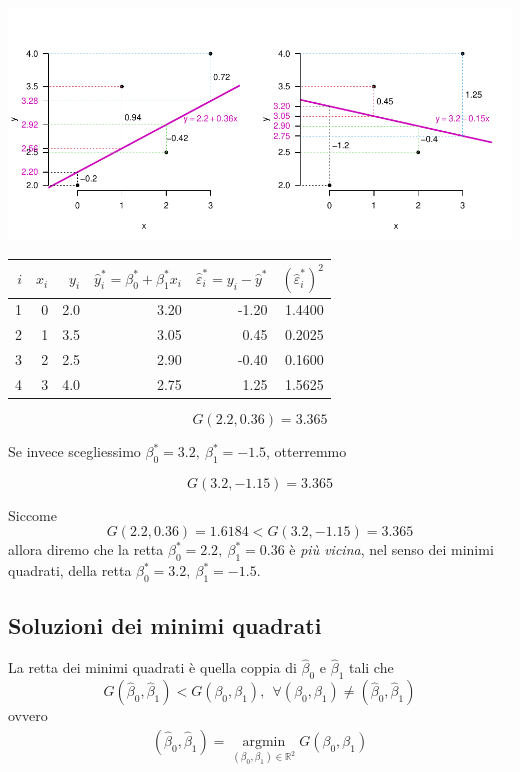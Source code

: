 \documentclass[
  11pt,
]{book}
\theoremstyle{mytheoremstyle}
\theoremstyle{mydefstyle}
\begin{document}
\begin{center}\includegraphics{Appunti_di_Statistica_2025_files/figure-latex/17-regressione-I-32-1} \end{center}

\begin{tabular}{rrrrrr}
\toprule
$i$ & $x_i$ & $y_i$ & $\hat y_i^*=\beta_0^*+\beta_1^*x_i$ & $\hat\varepsilon_i^*=y_i-\hat y^*$ & $({\hat\varepsilon_i^*})^2$\\
\midrule
1 & 0 & 2.0 & 3.20 & -1.20 & 1.4400\\
2 & 1 & 3.5 & 3.05 & 0.45 & 0.2025\\
3 & 2 & 2.5 & 2.90 & -0.40 & 0.1600\\
4 & 3 & 4.0 & 2.75 & 1.25 & 1.5625\\
\bottomrule
\end{tabular}

\[G(2.2,0.36)=3.365\]

Se invece scegliessimo \(\beta_0^*=3.2,~\beta_1^*=-1.5\), otterremmo

\[G(3.2,-1.15)=3.365\]

Siccome
\[G(2.2,0.36)=1.6184<G(3.2,-1.15)=3.365\]
allora diremo che la retta \(\beta_0^*=2.2,~\beta_1^*=0.36\) è \emph{più vicina}, nel senso dei minimi quadrati, della retta \(\beta_0^*=3.2,~\beta_1^*=-1.5\).

\subsection{Soluzioni dei minimi quadrati}\label{soluzioni-dei-minimi-quadrati}

La retta dei minimi quadrati è quella coppia di \(\hat\beta_0\) e \(\hat\beta_1\) tali che
\[G(\hat\beta_0,\hat\beta_1)<G(\beta_0,\beta_1),~~\forall(\beta_0,\beta_1)\neq(\hat\beta_0,\hat\beta_1)\]
ovvero
\begin{eqnarray*}
(\hat\beta_0,\hat\beta_1)=\operatorname*{argmin}_{(\beta_0,\beta_1)\in\mathbb{R}^2}G(\beta_0,\beta_1)
\end{eqnarray*}
\end{document}
